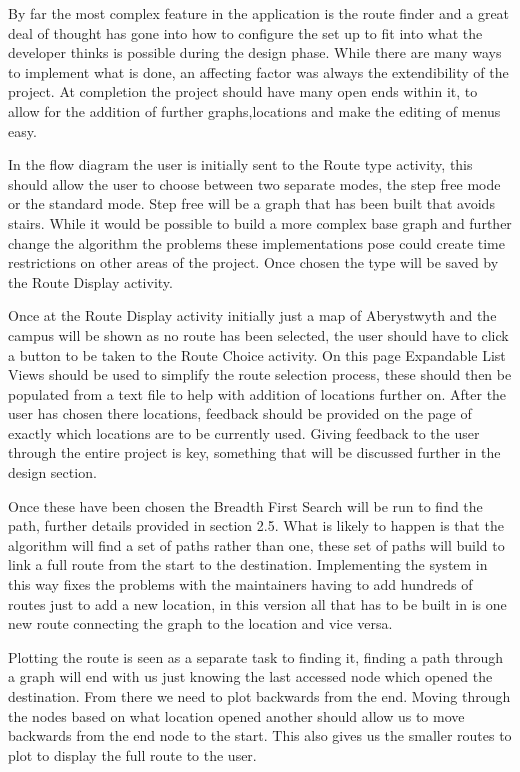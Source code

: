 By far the most complex feature in the application is the route finder and a great deal of thought has gone into how to configure the set up to fit into what the developer thinks is possible during the design phase. While there are many ways to implement what is done, an affecting factor was always the extendibility of the project. At completion the project should have many open ends within it, to allow for the addition of further graphs,locations and make the editing of menus easy. 

In the flow diagram the user is initially sent to the Route type activity, this should allow the user to choose between two separate modes, the step free mode or the standard mode. Step free will be a graph that has been built that avoids stairs. While it would be possible to build a more complex base graph and further change the algorithm the problems these implementations pose could create time restrictions on other areas of the project. Once chosen the type will be saved by the Route Display activity. 

Once at the Route Display activity initially just a map of Aberystwyth and the campus will be shown as no route has been selected, the user should have to click a button to be taken to the Route Choice activity. On this page Expandable List Views should be used to simplify the route selection process, these should then be populated from a text file to help with addition of locations further on. After the user has chosen there locations, feedback should be provided on the page of exactly which locations are to be currently used. Giving feedback to the user through the entire project is key, something that will be discussed further in the design section. 

Once these have been chosen the Breadth First Search will be run to find the path, further details provided in section 2.5. What is likely to happen is that the algorithm will find a set of paths rather than one, these set of paths will build to link a full route from the start to the destination. Implementing the system in this way fixes the problems with the maintainers having to add hundreds of routes just to add a new location, in this version all that has to be built in is one new route connecting the graph to the location and vice versa. 

Plotting the route is seen as a separate task to finding it, finding a path through a graph will end with us just knowing the last accessed node which opened the destination. From there we need to plot backwards from the end. Moving through the nodes based on what location opened another should allow us to move backwards from the end node to the start. This also gives us the smaller routes to plot to display the full route to the user.

